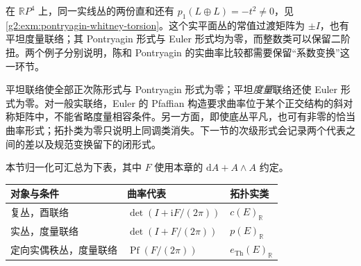 在 \(\mathbb RP^4\) 上，同一实线丛的两份直和还有 \(p_1(L\oplus L)=-t^2\ne0\)，见\cref{g2:exm:pontryagin-whitney-torsion}。这个实平面丛的常值过渡矩阵为 \(\pm I\)，也有平坦度量联络；其 Pontryagin 形式与 Euler 形式均为零，而整数类可以保留二阶扭。两个例子分别说明，陈和 Pontryagin 的实曲率比较都需要保留“系数变换”这一环节。

\ProseParagraphBreak

平坦联络使全部正次陈形式与 Pontryagin 形式为零；平坦\emph{度量}联络还使 Euler 形式为零。对一般实联络，Euler 的 Pfaffian 构造要求曲率位于某个正交结构的斜对称矩阵中，不能省略度量相容条件。另一方面，即使底丛平凡，也可有非零的恰当曲率形式；拓扑类为零只说明上同调类消失。下一节的次级形式会记录两个代表之间的差以及规范变换留下的闭形式。

本节归一化可汇总为下表，其中 \(F\) 使用本章的 \(\mathrm dA+A\wedge A\) 约定。
\begin{center}
	\begin{tabular}{lll}
		\hline
		对象与条件 & 曲率代表 & 拓扑实类 \\
		\hline
		复丛，酉联络 & \(\det(I+\mathrm iF/(2\pi))\) & \(c(E)_{\mathbb R}\) \\
		实丛，度量联络 & \(\det(I+F/(2\pi))\) & \(p(E)_{\mathbb R}\) \\
		定向实偶秩丛，度量联络 & \(\operatorname{Pf}(F/(2\pi))\) & \(e_{\mathrm{Th}}(E)_{\mathbb R}\) \\
		\hline
	\end{tabular}
\end{center}
